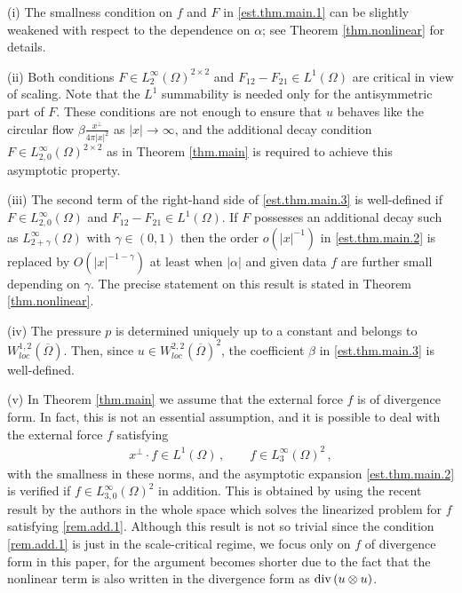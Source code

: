 \documentclass[11pt,a4paper]{article}
\begin{document}
\begin{remark} (i) The smallness condition on $f$ and $F$ in \eqref{est.thm.main.1} can be slightly weakened with respect to the dependence on $\alpha$;  see Theorem \ref{thm.nonlinear} for details.

\noindent 
(ii) Both conditions $F\in L^\infty_2 (\Omega)^{2\times 2}$ and $F_{12}-F_{21}\in L^1 (\Omega)$
are critical in view of scaling. Note that the $L^1$ summability is needed only for the antisymmetric part of $F$.
These conditions are not enough to ensure that  $u$ behaves like the circular flow $\beta \frac{x^\bot}{4\pi |x|^2}$ as $|x|\rightarrow \infty$,
and the additional decay condition $F\in L^\infty_{2,0} (\Omega)^{2\times 2}$ as in Theorem \ref{thm.main} is required to achieve this asymptotic property.


\noindent 
(iii) The second term of the right-hand side of \eqref{est.thm.main.3} is well-defined if $F\in L^\infty_{2,0} (\Omega)$ and $F_{12}-F_{21}\in L^1 (\Omega)$. If $F$ possesses an additional decay such as $L^\infty_{2+\gamma} (\Omega)$ with $\gamma\in (0,1)$ then the order $o(|x|^{-1})$ in \eqref{est.thm.main.2} is replaced by 
$O(|x|^{-1-\gamma})$ at least when $|\alpha|$ and given data $f$ are further small depending on $\gamma$.
The precise statement on this result is stated in Theorem \ref{thm.nonlinear}. 

\noindent 
(iv) The pressure $p$ is determined uniquely up to a constant and belongs to $W^{1,2}_{loc} (\overline{\Omega})$. Then, since $u\in W^{2,2}_{loc}(\overline{\Omega})^2$, the coefficient $\beta$ in \eqref{est.thm.main.3} is well-defined. 

\noindent 
(v) In Theorem \ref{thm.main} we assume that the external force $f$ is of divergence form. 
In fact, this is not an essential assumption, and it is possible to deal with the external force $f$ satisfying 
\begin{align}\label{rem.add.1}
 x^\bot \cdot f\in L^1 (\Omega)\,, \qquad f\in L^\infty_{3}(\Omega)^2\,,
\end{align}
with the smallness in these norms, and the asymptotic expansion \eqref{est.thm.main.2} is verified if $f\in L^\infty_{3,0} (\Omega)^2$ in addition. This is obtained by using the recent result by the authors \cite{HMN} in the whole space which solves the linearized problem for $f$ satisfying \eqref{rem.add.1}.
Although this result is not so trivial since the condition \eqref{rem.add.1} is just in the scale-critical regime,
we focus only on $f$ of divergence form in this paper, for the argument becomes shorter due to the fact that the nonlinear term is also written in the divergence form as ${\rm div}\, (u\otimes u)$.    
\end{remark}
\end{document}
